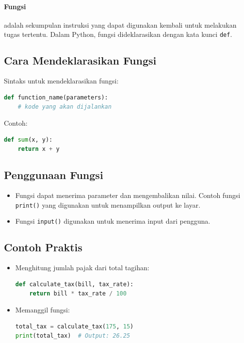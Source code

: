 \documentclass{article}
\begin{document}
\paragraph{Fungsi} adalah sekumpulan instruksi yang dapat digunakan kembali untuk melakukan tugas tertentu. Dalam Python, fungsi dideklarasikan dengan kata kunci \verb|def|.

\subsection{Cara Mendeklarasikan Fungsi}
Sintaks untuk mendeklarasikan fungsi:
\begin{lstlisting}[language=Python, caption={}, captionpos=b]
def function_name(parameters):
    # kode yang akan dijalankan
\end{lstlisting}
Contoh:
\begin{lstlisting}[language=Python, caption={}, captionpos=b]
def sum(x, y):
    return x + y
\end{lstlisting}

\subsection{Penggunaan Fungsi}
\begin{itemize}
    \item Fungsi dapat menerima parameter dan mengembalikan nilai. Contoh fungsi \verb|print()| yang digunakan untuk menampilkan output ke layar.
    \item Fungsi \verb|input()| digunakan untuk menerima input dari pengguna.
\end{itemize}

\subsection{Contoh Praktis}
\begin{itemize}
    \item Menghitung jumlah pajak dari total tagihan:
          \begin{lstlisting}[language=Python, caption={}, captionpos=b]
def calculate_tax(bill, tax_rate):
    return bill * tax_rate / 100
\end{lstlisting}
    \item Memanggil fungsi:
          \begin{lstlisting}[language=Python, caption={}, captionpos=b]
total_tax = calculate_tax(175, 15)
print(total_tax)  # Output: 26.25
\end{lstlisting}
\end{itemize}
\end{document}
